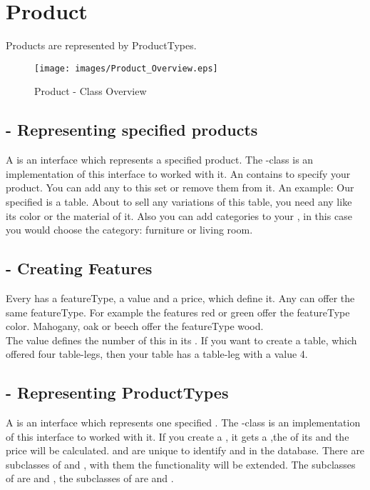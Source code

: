 \newpage
\section{Product}

Products are represented by ProductTypes.

\begin{figure}[ht]
	\centering
  \texttt{[image: images/Product\_Overview.eps]}
	\label{product_overview}
	\caption{Product - Class Overview}
\end{figure}

\subsection{ - Representing specified products}
A  is an interface which represents a specified product. The -class is an implementation of this interface to worked with it.
An  contains  to specify your product. You can add any   to this set or remove them from it.
An example: Our specified  is a table. About to sell any variations of this table, you need any  like its color or the material of it. 
Also you can add categories to your , in this case you would choose the category: furniture or living room.

\subsection{ - Creating Features}
Every  has a featureType, a value and a price, which define it. Any {} can offer the same featureType. For example the features red or green 
offer the featureType color. Mahogany, oak or beech offer the featureType wood.\\
The value defines the number of this  in its . If you want to create a table, which offered four table-legs, then your table has a  
table-leg with a value 4.   

\subsection{ - Representing ProductTypes}
A  is an interface which represents one specified . The -class is an implementation of this interface to worked with it.
If you create a , it gets a  ,the  of its  and the price will be calculated.
 and  are unique  to identify  and  in the database. 
There are subclasses of  and , with them the functionality will be extended. The subclasses of  are  and 
, the subclasses of  are  and . 

